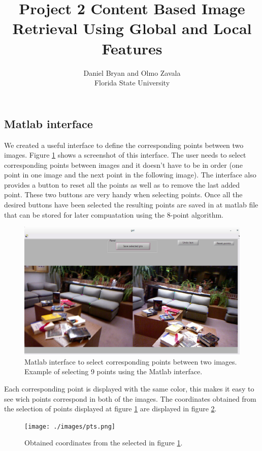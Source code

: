 \documentclass[a4paper,12pt]{article}
\title{Project 2 Content Based Image Retrieval Using Global and Local Features}
\author{Daniel Bryan and Olmo Zavala\\Florida State University}
\begin{document}
\maketitle

\subsection{Matlab interface}
We created a useful interface to define the corresponding points between two images.
Figure \ref{fig:demo} shows a screenshot of this interface. The user needs to select
corresponding points between images and it doesn't have to be in order (one point in one
image and the next point in the following image). The interface also provides a button to
reset all the points as well as to remove the last added point. These two buttons are
very handy when selecting points. Once all the desired buttons have been selected the 
resulting points are saved in at matlab file that can be stored for later compuatation
using the 8-point algorithm. 

\begin{figure}[h]
    \centering
    \includegraphics[totalheight=.38\textheight]{./images/Example.jpg}
    \caption{Matlab interface to select corresponding points between two images.
    Example of selecting 9 points using the Matlab interface.}
    \label{fig:demo}
\end{figure}

Each corresponding point is displayed with the same color, 
this makes it easy to see wich points correspond in both of the images.
The coordinates obtained from the selection of points displayed at figure \ref{fig:demo} 
are displayed in figure \ref{fig:pts}.

\begin{figure}[h]
    \centering
    \texttt{[image: ./images/pts.png]}
    \caption{Obtained coordinates from the selected in figure \ref{fig:demo}.}
    \label{fig:pts}
\end{figure}
\end{document}
